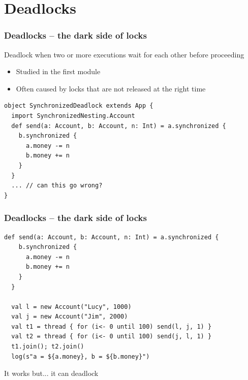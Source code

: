 \documentclass[aspectratio=169]{beamer}
\begin{document}
\section{Deadlocks}

\begin{frame}[fragile]\frametitle{Deadlocks -- the dark side of locks}

\begin{alertblock}{Deadlock}
  when two or more executions wait for each other before proceeding
\end{alertblock}

\begin{itemize}
  \item Studied in the first module
  \item Often caused by locks that are not released at the right time
\end{itemize}

\begin{lstlisting}[emph={assert,sleep,log,thread,join,synchronized}]
object SynchronizedDeadlock extends App {
  import SynchronizedNesting.Account
  def send(a: Account, b: Account, n: Int) = a.synchronized {
    b.synchronized {
      a.money -= n
      b.money += n
    }
  }
  ... // can this go wrong?
}
\end{lstlisting}
\end{frame}


\begin{frame}[fragile]\frametitle{Deadlocks -- the dark side of locks}
\begin{lstlisting}[emph={assert,sleep,log,thread,join,synchronized}]
  def send(a: Account, b: Account, n: Int) = a.synchronized {
    b.synchronized {
      a.money -= n
      b.money += n
    }
  }

  val l = new Account("Lucy", 1000)
  val j = new Account("Jim", 2000)
  val t1 = thread { for (i<- 0 until 100) send(l, j, 1) }
  val t2 = thread { for (i<- 0 until 100) send(j, l, 1) }
  t1.join(); t2.join()
  log(s"a = ${a.money}, b = ${b.money}")
\end{lstlisting}

{\Large \pause It works but... \pause \alert{it can deadlock}}
\end{frame}
\end{document}
